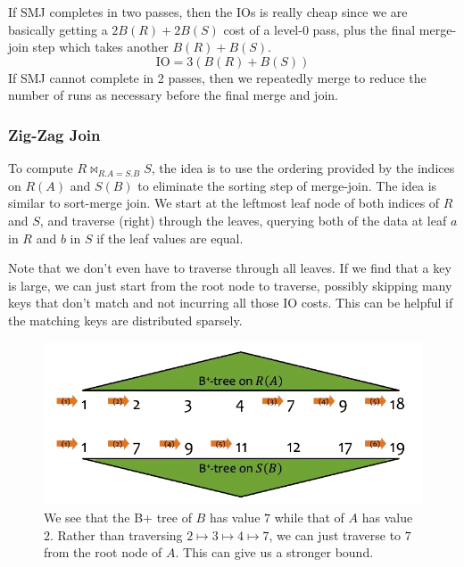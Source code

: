 \documentclass{article}
\begin{document}
      \begin{example} 
        If SMJ completes in two passes, then the IOs is really cheap since we are basically getting a $2 B(R) + 2 B(S)$ cost of a level-0 pass, plus the final merge-join step which takes another $B(R) + B(S)$. 
        \begin{equation}
          \mathrm{IO} = 3 ( B(R) + B(S)) 
        \end{equation}
        If SMJ cannot complete in 2 passes, then we repeatedly merge to reduce the number of runs as necessary before the final merge and join. 
      \end{example}

    \subsubsection{Zig-Zag Join} 

      \begin{definition}
        To compute $R \bowtie_{R.A = S.B} S$, the idea is to use the ordering provided by the indices on $R(A)$ and $S(B)$ to eliminate the sorting step of merge-join. The idea is similar to sort-merge join. We start at the leftmost leaf node of both indices of $R$ and $S$, and traverse (right) through the leaves, querying both of the data at leaf $a$ in $R$ and $b$ in $S$ if the leaf values are equal. 

        Note that we don't even have to traverse through all leaves. If we find that a key is large, we can just start from the root node to traverse, possibly skipping many keys that don't match and not incurring all those IO costs. This can be helpful if the matching keys are distributed sparsely.

        \begin{figure}[H]
          \centering 
          \includegraphics[scale=0.4]{img/zig_zag.png}
          \caption{We see that the B+ tree of $B$ has value $7$ while that of $A$ has value $2$. Rather than traversing $2 \mapsto 3 \mapsto 4 \mapsto 7$, we can just traverse to $7$ from the root node of $A$. This can give us a stronger bound. } 
          \label{fig:zig_zag}
        \end{figure}
      \end{definition}
\end{document}
